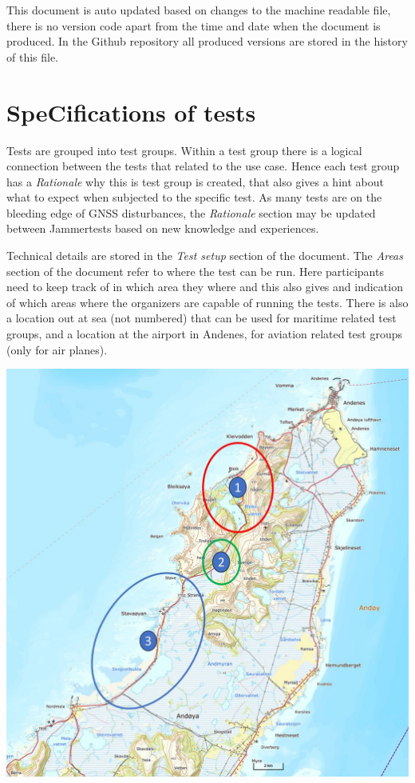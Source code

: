 \documentclass[a4paper]{book}
\begin{document}
This document is auto updated based on changes to the machine readable file, there is no version code apart from the time and date when the document is produced. In the Github repository all produced versions are stored in the history of this file.

\section{SpeCifications of tests}
Tests are grouped into test groups. Within a test group there is a logical connection between the tests that related to the use case. Hence each test group has a \textit{Rationale} why this is test group is created, that also gives a hint about what to expect when subjected to the specific test. As many tests are on the bleeding edge of GNSS disturbances, the \textit{Rationale} section may be updated between Jammertests based on new knowledge and experiences. \newline

Technical details are stored in the \textit{Test setup} section of the document. The \textit{Areas} section of the document refer to where the test can be run. Here participants need to keep track of in which area they where and this also gives and indication of which areas where the organizers are capable of running the tests. There is also a location out at sea (not numbered) that can be used for maritime related test groups, and a location at the airport in Andenes, for aviation related test groups (only for air planes).

\includegraphics[scale=0.4]{graphics/locations.png}
\end{document}
